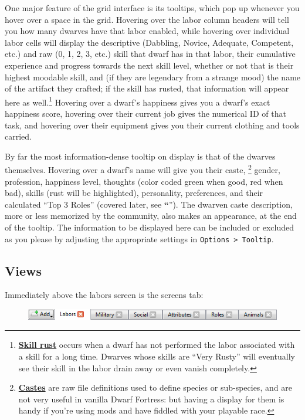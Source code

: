 \documentclass[]{article}
\newcommand{\jump}[1] {\textbf{``\nameref{sec:#1}}''}
\begin{document}
One major feature of the grid interface is its tooltips, which pop up whenever you hover over a space in
the grid. Hovering over the labor column headers will tell you how many dwarves have that labor enabled,
while hovering over individual labor cells will display the descriptive (Dabbling, Novice, Adequate,
Competent, etc.) and raw (0, 1, 2, 3, etc.) skill that dwarf has in that labor, their cumulative
experience and progress towards the next skill level, whether or not that is their highest moodable
skill, and (if they are legendary from a strange mood) the name of the artifact they crafted; if the
skill has rusted, that information will appear here as well.\footnote{
\href{http://dwarffortresswiki.org/index.php/DF2012:Skill\#Skill_rust}{\textbf{Skill rust}} occurs when
a dwarf has not performed the labor associated with a skill for a long time. Dwarves whose skills are
``Very Rusty'' will eventually see their skill in the labor drain away or even vanish completely.}
Hovering over a dwarf's happiness gives you a dwarf's exact happiness score, hovering over their current
job gives the numerical ID of that task, and hovering over their equipment gives you their current
clothing and tools carried.

By far the most information-dense tooltip on display is that of the dwarves themselves. Hovering over a
dwarf's name will give you their caste,
\footnote{\href{http://dwarffortresswiki.org/index.php/DF2012:Caste}{\textbf{Castes}} are raw file
definitions used to define species or sub-species, and are not very useful in vanilla Dwarf Fortress:
but having a display for them is handy if you're using mods and have fiddled with your playable race.}
gender, profession, happiness level, thoughts (color coded green when good, red when bad), skills (rust
will be highlighted), personality, preferences, and their calculated ``Top 3 Roles'' (covered later, see
\jump{Roles}). The dwarven caste description, more or less memorized by the community, also makes an
appearance, at the end of the tooltip. The information to be displayed here can be included or excluded
as you please by adjusting the appropriate settings in \texttt{Options > Tooltip}.

\newpage

\subsection{Views}
\label{sec:Screens Tab}
Immediately above the labors screen is the screens tab:

\begin{figure}[h!]
\centering
\includegraphics{Sec1Fig9}
\end{figure}
\end{document}
